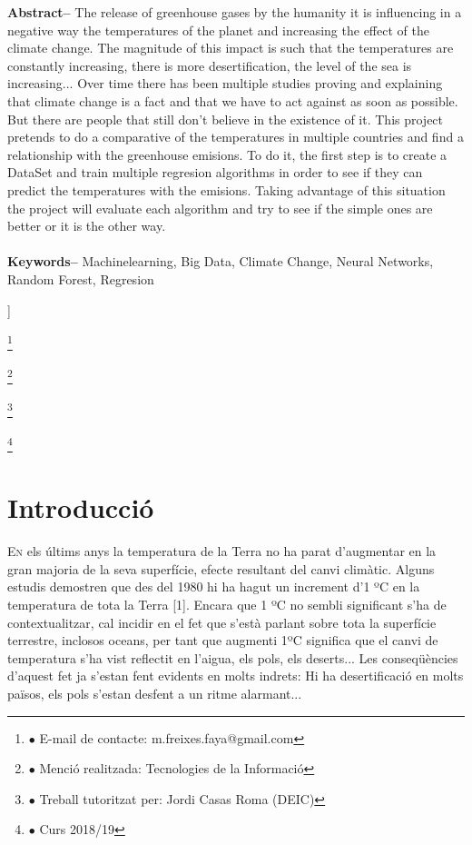 \documentclass[10pt,a4paper,twocolumn,twoside]{article}
\newcommand\blfootnote[1]{%
  \begingroup
  \renewcommand\thefootnote{}\footnote{#1}%
  \addtocounter{footnote}{-1}%
  \endgroup
}
\begin{document}
\begin{@twocolumnfalse}
\begin{center}
{\textbf{Abstract--} The release of greenhouse gases by the humanity it is influencing in a negative way the temperatures of the planet and increasing the effect of the climate change. The magnitude of this impact is such that the temperatures are constantly increasing, there is more desertification, the level of the sea is increasing... Over time there has been multiple studies proving and explaining that climate change is a fact and that we have to act against as soon as possible. But there are people that still don't believe in the existence of it. This project pretends to do a comparative of the temperatures in multiple countries and find a relationship with the greenhouse emisions. To do it, the first step is to create a DataSet and train multiple regresion algorithms in order to see if they can predict the temperatures with the emisions. Taking advantage of this situation the project will evaluate each algorithm and try to see if the simple ones are better or it is the other way. 
\\
\\
\textbf{Keywords-- } Machinelearning, Big Data, Climate Change, Neural Networks, Random Forest, Regresion\\
}

\bigskip

{\vrule depth 0pt height 0.5pt width 4cm\hspace{7.5pt}%
%
\hspace{7.5pt}\vrule depth 0pt height 0.5pt width 4cm\relax}

\end{center}

\bigskip
\end{@twocolumnfalse}]

\blfootnote{$\bullet$ E-mail de contacte: m.freixes.faya@gmail.com}
\blfootnote{$\bullet$ Menció realitzada: Tecnologies de la Informació}
\blfootnote{$\bullet$ Treball tutoritzat per: Jordi Casas Roma (DEIC)}
\blfootnote{$\bullet$ Curs 2018/19}
\section{Introducció}
\lettrine[lines=3]{E}{n} els últims anys la temperatura de la Terra no ha parat d'augmentar en la gran majoria de la seva superfície, efecte resultant del canvi climàtic. Alguns estudis demostren que des del 1980 hi ha hagut un increment d'1 ºC en la temperatura de tota la Terra [1]. Encara que 1 ºC no sembli significant s'ha de contextualitzar, cal incidir en el fet que s'està parlant sobre tota la superfície terrestre, inclosos oceans, per tant que augmenti 1ºC significa que el canvi de temperatura s'ha vist reflectit en l'aigua, els pols, els deserts... Les conseqüències d'aquest fet ja s'estan fent evidents en molts indrets: Hi ha desertificació en molts països, els pols s'estan desfent a un ritme alarmant...
\end{document}
